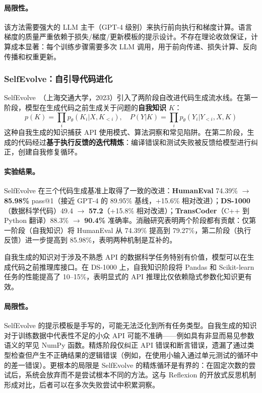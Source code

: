 \paragraph{局限性。}
该方法需要强大的 LLM 主干（GPT-4 级别）来执行前向执行和梯度计算。语言梯度的质量严重依赖于损失/梯度/更新模板的提示设计。不存在理论收敛保证，计算成本显著：每个训练步骤需要多次 LLM 调用，用于前向传递、损失计算、反向传播和权重更新。


\subsubsection{SelfEvolve：自引导代码进化}

SelfEvolve~\citep{selfevolve2023}（上海交通大学，2023）引入了两阶段自改进代码生成流水线。在第一阶段，模型在生成代码之前生成关于问题的\textbf{自我知识} $K$：
\begin{equation}
p(K) = \prod_i p_\theta(K_i | X, K_{<i}), \quad P(Y|K) = \prod_i p_\theta(Y_i | Y_{<i}, X, K)
\end{equation}
这种自我生成的知识捕获 API 使用模式、算法洞察和常见陷阱。在第二阶段，生成的代码经过\textbf{基于执行反馈的迭代精炼}：编译错误和测试失败被反馈给模型进行纠正，创建自我修复循环。

\paragraph{实验结果。}
SelfEvolve 在三个代码生成基准上取得了一致的改进：\textbf{HumanEval} 74.39\% $\rightarrow$ \textbf{85.98\%} pass@1（接近 GPT-4 的 89.95\% 基线，+15.6\% 相对改进）；\textbf{DS-1000}（数据科学代码）49.4 $\rightarrow$ \textbf{57.2}（+15.8\% 相对改进）；\textbf{TransCoder}（C++ 到 Python 翻译）88.3\% $\rightarrow$ \textbf{90.4\%} 准确率。消融研究表明两个阶段都有贡献：仅第一阶段（自我知识）将 HumanEval 从 74.39\% 提高到 79.27\%，第二阶段（执行反馈）进一步提高到 85.98\%，表明两种机制是互补的。

自我生成的知识对于涉及不熟悉 API 的数据科学任务特别有价值，模型可以在生成代码之前推理库接口。在 DS-1000 上，自我知识阶段将 Pandas 和 Scikit-learn 任务的性能提高了 10--15\%，表明显式的 API 推理比仅依赖隐式参数化知识更有效。

\paragraph{局限性。}
SelfEvolve 的提示模板是手写的，可能无法泛化到所有任务类型。自我生成的知识对于训练数据中代表性不足的小众 API 可能不准确——例如具有非显而易见参数语义的罕见 NumPy 函数。精炼阶段仅纠正 API 错误和断言错误，遗漏了通过类型检查但产生不正确结果的逻辑错误（例如，在使用小输入通过单元测试的循环中的差一错误）。更根本的局限是 SelfEvolve 的精炼循环是有界的：在固定次数的尝试后，系统会放弃而不是尝试根本不同的方法。这与 Reflexion 的开放式反思机制形成对比，后者可以在多次失败尝试中积累洞察。


